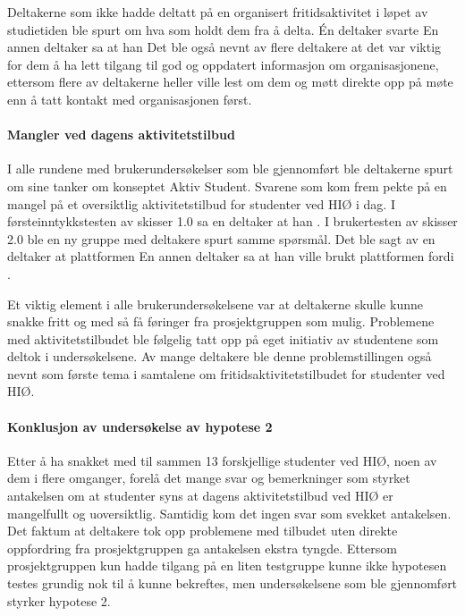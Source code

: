 Deltakerne som ikke hadde deltatt på en organisert fritidsaktivitet i løpet av studietiden ble spurt om hva som holdt dem fra å delta. Én deltaker svarte  En annen deltaker sa at han  Det ble også nevnt av flere deltakere at det var viktig for dem å ha lett tilgang til god og oppdatert informasjon om organisasjonene, ettersom flere av deltakerne heller ville lest om dem og møtt direkte opp på møte enn å tatt kontakt med organisasjonen først.

\paragraph{Mangler ved dagens aktivitetstilbud}
I alle rundene med brukerundersøkelser som ble gjennomført ble deltakerne spurt om sine tanker om konseptet Aktiv Student. Svarene som kom frem pekte på en mangel på et oversiktlig aktivitetstilbud for studenter ved HIØ i dag. I førsteinntykkstesten av skisser 1.0 sa en deltaker at han . I brukertesten av skisser 2.0 ble en ny gruppe med deltakere spurt samme spørsmål. Det ble sagt av en deltaker at plattformen  En annen deltaker sa at han ville brukt plattformen fordi .

Et viktig element i alle brukerundersøkelsene var at deltakerne skulle kunne snakke fritt og med så få føringer fra prosjektgruppen som mulig. Problemene med aktivitetstilbudet ble følgelig tatt opp på eget initiativ av studentene som deltok i undersøkelsene. Av mange deltakere ble denne problemstillingen også nevnt som første tema i samtalene om fritidsaktivitetstilbudet for studenter ved HIØ.

\paragraph{Konklusjon av undersøkelse av hypotese 2}
Etter å ha snakket med til sammen 13 forskjellige studenter ved HIØ, noen av dem i flere omganger, forelå det mange svar og bemerkninger som styrket antakelsen om at studenter syns at dagens aktivitetstilbud ved HIØ er mangelfullt og uoversiktlig. Samtidig kom det ingen svar som svekket antakelsen. Det faktum at deltakere tok opp problemene med tilbudet uten direkte oppfordring fra prosjektgruppen ga antakelsen ekstra tyngde. Ettersom prosjektgruppen kun hadde tilgang på en liten testgruppe kunne ikke hypotesen testes grundig nok til å kunne bekreftes, men undersøkelsene som ble gjennomført styrker hypotese 2.

